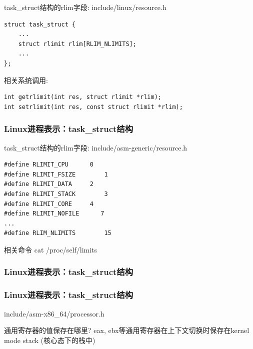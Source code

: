 \documentclass[xcolor=svgnames]{beamer}
\begin{document}
\begin{CJK*}{UTF8}{gbsn}
\begin{frame}[fragile]
\begin{block}{task\_struct结构的rlim字段: include/linux/resource.h}
\begin{verbatim}
struct task_struct {
    ...
    struct rlimit rlim[RLIM_NLIMITS];
    ...
};
\end{verbatim}
\end{block}
\begin{block}{相关系统调用:}
\begin{verbatim}
int getrlimit(int res, struct rlimit *rlim);
int setrlimit(int res, const struct rlimit *rlim);
\end{verbatim}
\end{block}
\end{frame}

\begin{frame}[fragile]
\frametitle{Linux进程表示：task\_struct结构}
\begin{block}{task\_struct结构的rlim字段: include/asm-generic/resource.h}
\begin{verbatim}
#define RLIMIT_CPU      0   
#define RLIMIT_FSIZE        1  
#define RLIMIT_DATA     2   
#define RLIMIT_STACK        3 
#define RLIMIT_CORE     4   
#define RLIMIT_NOFILE      7  
...
#define RLIM_NLIMITS        15
\end{verbatim}
\end{block}
\begin{block}{相关命令}
cat /proc/self/limits
\end{block}
\end{frame}

\begin{frame}[fragile]
\frametitle{Linux进程表示：task\_struct结构}
\lstthreadintask
\end{frame}

\begin{frame}[fragile]
\frametitle{Linux进程表示：task\_struct结构}
\begin{block}{include/asm-x86\_64/processor.h}
\lstthreadstruct
\end{block}
\begin{block}{通用寄存器的值保存在哪里?}
\alert{eax}, \alert{ebx}等通用寄存器在上下文切换时保存在kernel mode stack (核心态下的栈中)
\end{block}
\end{frame}


\end{CJK*}
\end{document}
